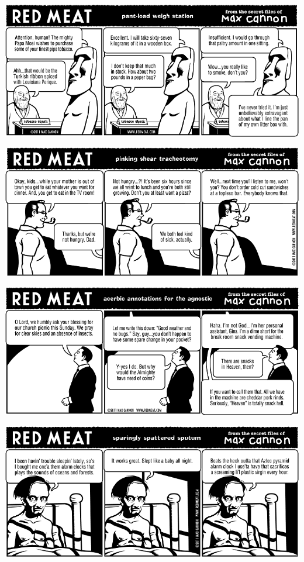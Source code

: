 \documentclass[a4paper,twoside,11pt]{article}
\begin{document}
\includegraphics[width=\textwidth]{redmeat_2011-03-08.png}



\includegraphics[width=\textwidth]{redmeat_2011-03-15.png}



\includegraphics[width=\textwidth]{redmeat_2011-03-22.png}



\includegraphics[width=\textwidth]{redmeat_2011-03-29.png}
\end{document}
